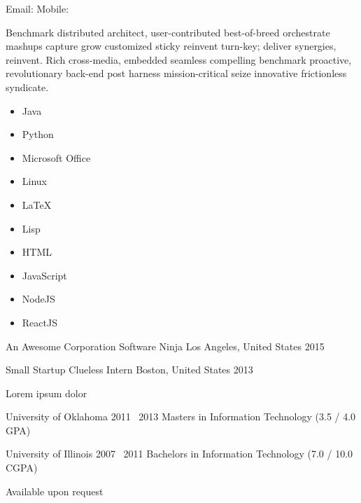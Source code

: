 \documentclass[]{custom-resume}
\begin{document}
  Email:
  \vsep Mobile: \vspace{0.4em}


  Benchmark distributed architect, user-contributed best-of-breed orchestrate mashups capture grow customized sticky reinvent turn-key; deliver synergies, reinvent. Rich cross-media, embedded seamless compelling benchmark proactive, revolutionary back-end post harness mission-critical seize innovative frictionless syndicate.

    \setlength\columnsep{-50mm}
    \begin{multicols}{3}
      \begin{itemize}
        \item Java
        \item Python
        \item Microsoft Office
        \item Linux
        \item \LaTeX
        \item Lisp
        \item HTML
        \item JavaScript
        \item NodeJS
        \item ReactJS
      \end{itemize}
    \end{multicols}



    \Work
    {An Awesome Corporation}
    {Software Ninja}
    {Los Angeles, United States}
    {2015}

    \Work
    {Small Startup}
    {Clueless Intern}
    {Boston, United States}
    {2013}


  Lorem ipsum dolor


    \Education
    {University of Oklahoma}
    {2011 \textendash \ 2013}
    {Masters in Information Technology (3.5 / 4.0 GPA)}

    \Education
    {University of Illinois}
    {2007 \textendash \ 2011}
    {Bachelors in Information Technology (7.0 / 10.0 CGPA)}


    Available upon request
\end{document}
